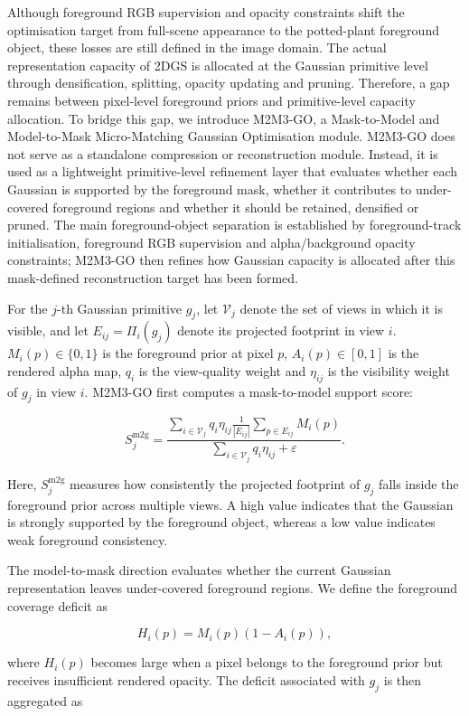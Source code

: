 \documentclass[a4paper]{cas-sc}
\begin{document}
Although foreground RGB supervision and opacity constraints shift the optimisation target from full-scene appearance to the potted-plant foreground object, these losses are still defined in the image domain. The actual representation capacity of 2DGS is allocated at the Gaussian primitive level through densification, splitting, opacity updating and pruning. Therefore, a gap remains between pixel-level foreground priors and primitive-level capacity allocation. To bridge this gap, we introduce M2M3-GO, a Mask-to-Model and Model-to-Mask Micro-Matching Gaussian Optimisation module. M2M3-GO does not serve as a standalone compression or reconstruction module. Instead, it is used as a lightweight primitive-level refinement layer that evaluates whether each Gaussian is supported by the foreground mask, whether it contributes to under-covered foreground regions and whether it should be retained, densified or pruned. The main foreground-object separation is established by foreground-track initialisation, foreground RGB supervision and alpha/background opacity constraints; M2M3-GO then refines how Gaussian capacity is allocated after this mask-defined reconstruction target has been formed.

For the \(j\)-th Gaussian primitive \(g_j\), let \(\mathcal{V}_j\) denote the set of views in which it is visible, and let \(E_{ij}=\Pi_i(g_j)\) denote its projected footprint in view \(i\). \(M_i(p)\in\{0,1\}\) is the foreground prior at pixel \(p\), \(A_i(p)\in[0,1]\) is the rendered alpha map, \(q_i\) is the view-quality weight and \(\eta_{ij}\) is the visibility weight of \(g_j\) in view \(i\). M2M3-GO first computes a mask-to-model support score:

\[
S^{\text{m2g}}_j=
\frac{
\sum_{i\in \mathcal{V}_j} q_i \eta_{ij}
\frac{1}{|E_{ij}|}\sum_{p\in E_{ij}} M_i(p)
}{
\sum_{i\in \mathcal{V}_j} q_i \eta_{ij}+\varepsilon
}.
\]

Here, \(S^{\text{m2g}}_j\) measures how consistently the projected footprint of \(g_j\) falls inside the foreground prior across multiple views. A high value indicates that the Gaussian is strongly supported by the foreground object, whereas a low value indicates weak foreground consistency.

The model-to-mask direction evaluates whether the current Gaussian representation leaves under-covered foreground regions. We define the foreground coverage deficit as

\[
H_i(p)=M_i(p)\left(1-A_i(p)\right),
\]

where \(H_i(p)\) becomes large when a pixel belongs to the foreground prior but receives insufficient rendered opacity. The deficit associated with \(g_j\) is then aggregated as
\end{document}
